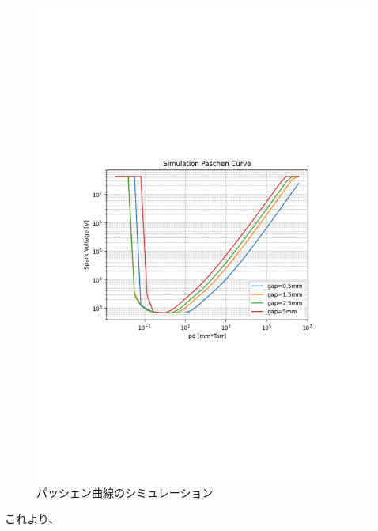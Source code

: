 \documentclass[a4j,twocolumn]{jsarticle}
\begin{document}
\begin{figure}[htb]
    \centering
    \includegraphics[keepaspectratio,width=0.6\columnwidth]{fig/paschen_curve.pdf}
    \caption{パッシェン曲線のシミュレーション}
\end{figure}

これより、
















\end{document}
